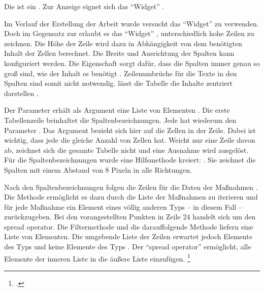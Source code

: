 Die  ist ein   .
Zur Anzeige eignet sich das \enquote{Widget}  . 



Im Verlauf der Erstellung der Arbeit wurde versucht das \enquote{Widget}  zu verwenden.
Doch im Gegensatz zur  erlaubt es das \enquote{Widget} , unterschiedlich hohe Zeilen zu zeichnen.
Die Höhe der Zeile wird dazu in Abhängigkeit von dem benötigten Inhalt der Zellen berechnet.
Die Breite und Ausrichtung der Spalten kann konfiguriert werden.
Die Eigenschaft  sorgt dafür,
dass die Spalten immer genau so groß sind,
wie der Inhalt es benötigt . 
Zeilenumbrüche für die Texte in den Spalten sind somit nicht notwendig.
lässt die  Tabelle die Inhalte zentriert darstellen .

Der Parameter  erhält als Argument eine Liste von  Elementen .
Die erste Tabellenzeile  beinhaltet die Spaltenbezeichnungen.
Jede  hat wiederum den Parameter .
Das Argument bezieht sich hier auf die Zellen in der Zeile.
Dabei ist wichtig, dass jede  die gleiche Anzahl von Zellen hat.
Weicht nur eine Zeile davon ab, zeichnet sich die gesamte Tabelle nicht und eine Ausnahme wird ausgelöst.
Für die Spaltenbezeichnungen wurde eine Hilfsmethode kreiert:  .
Sie zeichnet die Spalten mit einem Abstand von 8 Pixeln in alle Richtungen.

Nach den Spaltenbezeichnungen folgen die Zeilen für die Daten der Maßnahmen .
Die Methode   ermöglicht es dazu durch die Liste der Maßnahmen zu iterieren und für jede Maßnahme ein Element eines völlig anderen Typs -- in diesem Fall  -- zurückzugeben.
Bei den vorangestellten Punkten  in Zeile 24 handelt sich um den spread operator.
Die Filtermethode  und die darauffolgende Methode  liefern eine Liste von  Elementen.
Die umgebende Liste der Zeilen   erwartet jedoch Elemente des Typs  und keine Elemente des Typs .
Der \enquote{spread operator} ermöglicht,
alle Elemente der inneren Liste in die äußere Liste einzufügen. \footcite[Vgl.][]{SpreadOperator}

